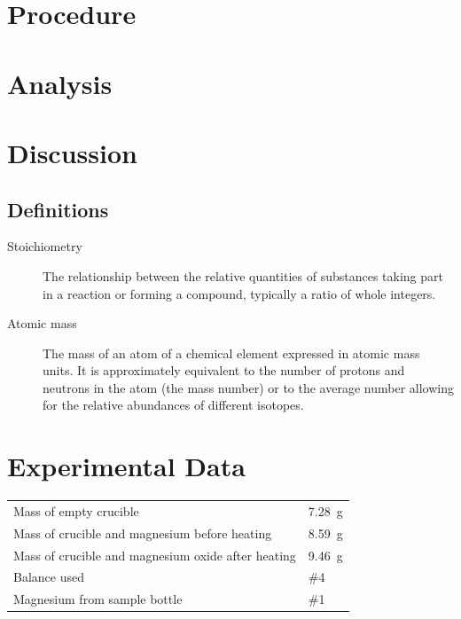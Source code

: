 \documentclass{article}
\begin{document}
\section{Procedure}


\section{Analysis}


\section{Discussion}

\subsection{Definitions}
\label{definitions}
\begin{description}
\item[Stoichiometry]
The relationship between the relative quantities of substances taking part in a reaction or forming a compound, typically a ratio of whole integers.
\item[Atomic mass]
The mass of an atom of a chemical element expressed in atomic mass units. It is approximately equivalent to the number of protons and neutrons in the atom (the mass number) or to the average number allowing for the relative abundances of different isotopes. 
\end{description} 
 


\section{Experimental Data}

\begin{tabular}{ll}
Mass of empty crucible & \SI{7.28}{\gram}\\
Mass of crucible and magnesium before heating & \SI{8.59}{\gram}\\
Mass of crucible and magnesium oxide after heating & \SI{9.46}{\gram}\\
Balance used & \#4\\
Magnesium from sample bottle & \#1
\end{tabular}
\end{document}
